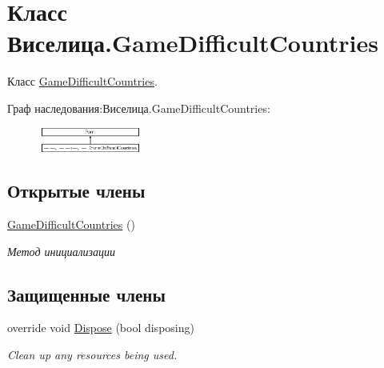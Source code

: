 \hypertarget{class_xD0_x92_xD0_xB8_xD1_x81_xD0_xB5_xD0_xBB_xD0_xB8_xD1_x86_xD0_xB0_1_1_game_difficult_countries}{\section{Класс Виселица.\+Game\+Difficult\+Countries}
\label{class_xD0_x92_xD0_xB8_xD1_x81_xD0_xB5_xD0_xBB_xD0_xB8_xD1_x86_xD0_xB0_1_1_game_difficult_countries}
}


Класс \hyperlink{class_xD0_x92_xD0_xB8_xD1_x81_xD0_xB5_xD0_xBB_xD0_xB8_xD1_x86_xD0_xB0_1_1_game_difficult_countries}{Game\+Difficult\+Countries}.  


Граф наследования\+:Виселица.\+Game\+Difficult\+Countries\+:\begin{figure}[H]
\begin{center}
\leavevmode
\includegraphics[height=0.815138cm]{class_xD0_x92_xD0_xB8_xD1_x81_xD0_xB5_xD0_xBB_xD0_xB8_xD1_x86_xD0_xB0_1_1_game_difficult_countries}
\end{center}
\end{figure}
\subsection*{Открытые члены}
\begin{DoxyCompactItemize}
\item 
\hyperlink{class_xD0_x92_xD0_xB8_xD1_x81_xD0_xB5_xD0_xBB_xD0_xB8_xD1_x86_xD0_xB0_1_1_game_difficult_countries_a387325ece898d55c197ba03da390a47d}{Game\+Difficult\+Countries} ()
\begin{DoxyCompactList}\small\item\em Метод инициализации \end{DoxyCompactList}\end{DoxyCompactItemize}
\subsection*{Защищенные члены}
\begin{DoxyCompactItemize}
\item 
override void \hyperlink{class_xD0_x92_xD0_xB8_xD1_x81_xD0_xB5_xD0_xBB_xD0_xB8_xD1_x86_xD0_xB0_1_1_game_difficult_countries_af7eea88e8a69c00ceab22485bc504d69}{Dispose} (bool disposing)
\begin{DoxyCompactList}\small\item\em Clean up any resources being used. \end{DoxyCompactList}\end{DoxyCompactItemize}


